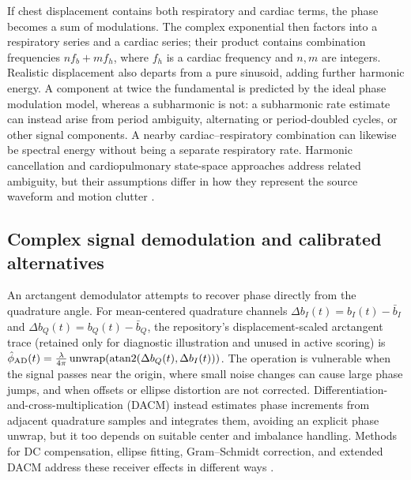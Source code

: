 If chest displacement contains both respiratory and cardiac terms, the phase becomes a sum of
modulations. The complex exponential then factors into a respiratory series and a cardiac series;
their product contains combination frequencies $n f_b + m f_h$, where $f_h$ is a cardiac
frequency and $n,m$ are integers. Realistic displacement also departs from a pure sinusoid, adding
further harmonic energy. A component at twice the fundamental is predicted by the ideal phase
modulation model, whereas a subharmonic is not: a subharmonic rate estimate can instead arise from
period ambiguity, alternating or period-doubled cycles, or other signal components. A nearby
cardiac--respiratory combination can likewise be spectral energy without being a separate
respiratory rate. Harmonic cancellation and cardiopulmonary state-space approaches address related
ambiguity, but their assumptions differ in how they represent the source waveform and motion
clutter \citep{naishadham2016estimation,beltrao2023adaptive}.

\subsection{Complex signal demodulation and calibrated alternatives}

An arctangent demodulator attempts to recover phase directly from the quadrature angle. For
mean-centered quadrature channels $\Delta b_I(t) = b_I(t)-\bar b_I$ and
$\Delta b_Q(t) = b_Q(t)-\bar b_Q$, the repository's displacement-scaled arctangent trace (retained
only for diagnostic illustration and unused in active scoring) is
$\hat{\phi}_{\mathrm{AD}}(t)=\frac{\lambda}{4\pi}\operatorname{unwrap}(\operatorname{atan2}(\Delta b_Q(t),\Delta b_I(t)))$.
The operation is vulnerable when the signal passes near the origin, where small noise changes can
cause large phase jumps, and when offsets or ellipse distortion are not corrected.
Differentiation-and-cross-multiplication (DACM) instead estimates phase increments from adjacent
quadrature samples and integrates them, avoiding an explicit phase unwrap, but it too depends on
suitable center and imbalance handling. Methods for DC compensation, ellipse fitting, Gram--Schmidt
correction, and extended DACM address these receiver effects in different ways
\citep{park2007arctangent,wang2014noncontact,fitzgibbon1999direct,singh2013data,zakrzewski2014quadrature}.

